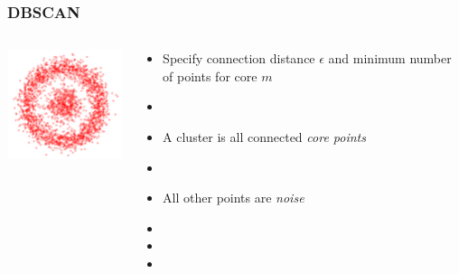 \documentclass[xcolor={dvipsnames}]{beamer}
\begin{document}
\frame
{
 \frametitle{DBSCAN}

\begin{columns}
\begin{column}{.4\textwidth}
\includegraphics[width=1.75in]{stuffs/kmeanstrap.png}

\hspace*{1em}
\end{column}
\begin{column}{.65\textwidth}

\vspace{-1em}
\begin{itemize}
\item<2-> Specify connection distance $\epsilon$ and minimum number of points for core $m$
\item[]
\item<3-> A cluster is all connected \emph{core points}
\item[]
\item<4-> All other points are \emph{noise}
\item[]
\item[]
\item[]
\end{itemize}

\end{column}
\end{columns}


}
\end{document}
